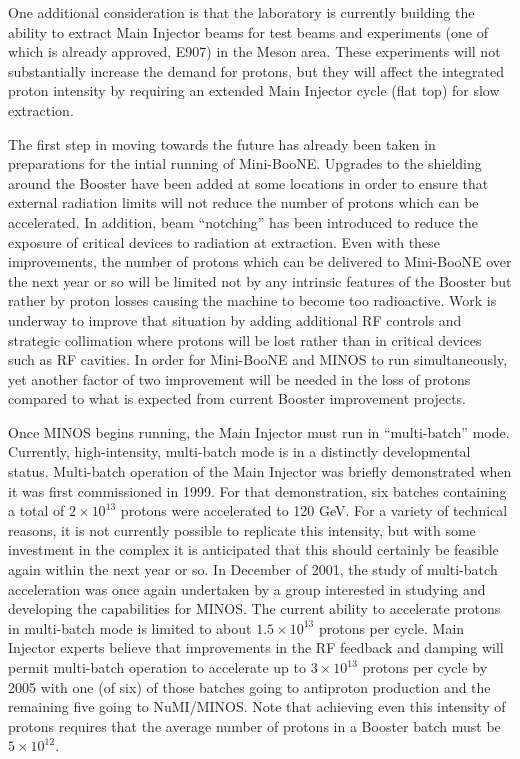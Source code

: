 \documentclass{article}
\begin{document}
One additional consideration is that the laboratory
is currently building the ability to extract Main Injector beams for
test beams and experiments (one of which is already approved, E907) in the
Meson area. These experiments will not substantially increase the demand for
protons, but they will affect the integrated proton intensity  by requiring 
an extended Main Injector cycle (flat top) for slow extraction.

The first step in moving towards the future has already been taken in 
preparations for the intial running of Mini-BooNE. Upgrades to the
shielding around the Booster have been added at some locations in order to
ensure that external radiation limits will not reduce the number of protons
which can be accelerated. In addition, beam ``notching'' has been introduced
to reduce the exposure of critical devices to radiation at extraction.
Even with these improvements, the number of protons which can be delivered
to Mini-BooNE over the next year or so will be limited not by any intrinsic
features of the Booster but rather by proton losses causing the machine to
become too radioactive. Work is underway to improve that situation by adding
additional RF controls and strategic collimation where protons will be lost
rather than in critical devices such as RF cavities. In order for Mini-BooNE
and MINOS to run simultaneously, yet another factor of two improvement will be
needed in the loss of protons compared to what is expected from current Booster
improvement projects.

Once MINOS begins running, the Main Injector must run in ``multi-batch'' mode.
Currently, high-intensity, 
multi-batch mode is in a distinctly developmental status. 
Multi-batch operation of the Main Injector was briefly demonstrated when it
was first commissioned in 1999. For that demonstration, six batches
containing a total of $2 \times 10^{13}$ protons were accelerated to 120 GeV.
For a variety of technical reasons, it is not currently possible to replicate
this intensity, but with some investment in the complex it is anticipated
that this should certainly be feasible again within the next year or so.
In December of 2001, the study of  multi-batch acceleration was once again
undertaken by a group interested in studying and developing the capabilities 
for MINOS. The current ability to accelerate protons in multi-batch mode is
limited to about $1.5 \times 10^{13}$ protons per cycle. Main Injector experts
believe that improvements in the RF feedback and damping will permit
multi-batch operation to accelerate up to $3 \times 10^{13}$ protons per
cycle by 2005 with one (of six) of those batches going to antiproton production
and the remaining five going to NuMI/MINOS. Note that achieving even this
intensity of protons requires that the average number of protons in a Booster
batch must be $5 \times 10^{12}$. 
\end{document}
